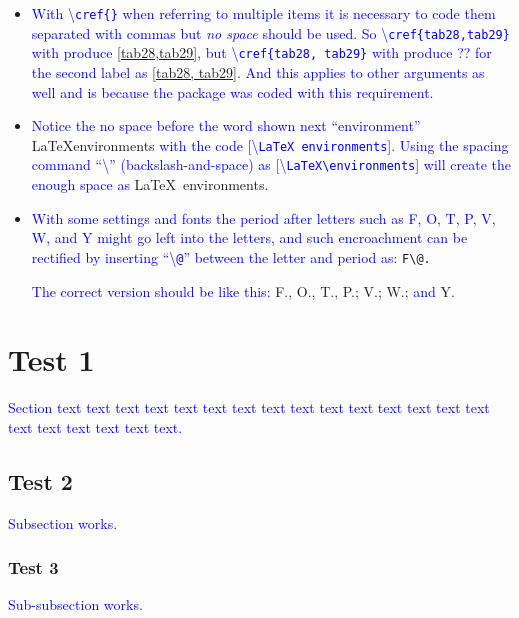 \documentclass[phd,showgrids]{ndsu-thesis-2022}
\newcommand\italk[1]{\textcolor{blue}{#1}}  %
\newcommand\cmd[1]{\textbackslash\texttt{#1}}  %
\begin{document}
\begin{itemize}
\item
\italk{With \cmd{cref\{\}} when referring to multiple items it is necessary to code them separated with commas but \emph{no space} should be used. So \cmd{cref\{tab28,tab29\}} with produce} \cref{tab28,tab29}\italk{, but \cmd{cref\{tab28, tab29\}} with produce ?? for the second label as } \cref{tab28, tab29}\italk{. And this applies to other arguments as well and is because the package was coded with this requirement.}

\item
\italk{Notice the no space before the word shown next ``environment''}  \LaTeX environments \italk{with the code [\cmd{LaTeX environments}]. Using the spacing command ``\cmd{\:}'' (backslash-and-space) as [\cmd{LaTeX\textbackslash\:environments}] will create the enough space as} \LaTeX\ environments\italk{.}

\item
\italk{With some settings and fonts the period after letters such as F, O, T, P, V, W, and Y might go left into the letters, and such encroachment can be rectified by inserting ``\cmd{@}'' between the letter and period as:} {\LARGE{\verb|F\@.|}} 

\italk{The correct version should be like this:} {\LARGE F\@., O\@., T\@., P\@.; V\@.; W\@.;} \italk{and} {\LARGE Y\@.}


\end{itemize}


\section{Test 1}
\italk{Section text text text text text text text text text text text text text text text text text text text text text.}

\subsection{Test 2}
\italk{Subsection works.}

\subsubsection{Test 3}
\italk{Sub-subsection works.} 
\kant[3]
\end{document}
